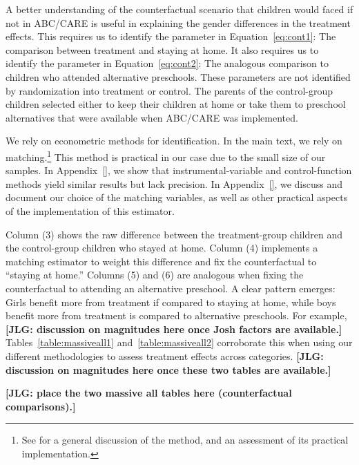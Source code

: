 A better understanding of the counterfactual scenario that children would faced if not in ABC/CARE is useful in explaining the gender differences in the treatment effects. This requires us to identify the parameter in Equation~\eqref{eq:cont1}: The comparison between treatment and staying at home. It also requires us to identify the parameter in Equation~\eqref{eq:cont2}: The analogous comparison to children who attended alternative preschools. These parameters are not identified by randomization into treatment or control. The parents of the control-group children selected either to keep their children at home or take them to preschool alternatives that were available when ABC/CARE was implemented. 

We rely on econometric methods for identification. In the main text, we rely on matching.\footnote{See \citet{Heckman_Ichimura_etal_1998_REStud} for a general discussion of the method, and an assessment of its practical implementation.} This method is practical in our case due to the small size of our samples. In Appendix~\ref{}, we show that instrumental-variable and control-function methods yield similar results but lack precision. In Appendix~\ref{}, we discuss and document our choice of the matching variables, as well as other practical aspects of the implementation of this estimator.

Column (3) shows the raw difference between the treatment-group children and the control-group children who stayed at home. Column (4) implements a matching estimator to weight this difference and fix the counterfactual to ``staying at home.''  Columns (5) and (6) are analogous when fixing the counterfactual to attending an alternative preschool. A clear pattern emerges: Girls benefit more from treatment if compared to staying at home, while boys benefit more from treatment is compared to alternative preschools. For example, \textbf{[JLG: discussion on magnitudes here once Josh factors are available.]} Tables~\ref{table:massiveall1} and~\ref{table:massiveall2} corroborate this when using our different methodologies to assess treatment effects across categories. \textbf{[JLG: discussion on magnitudes here once these two tables are available.]}

\textbf{[JLG: place the two massive all tables here (counterfactual comparisons).]}

